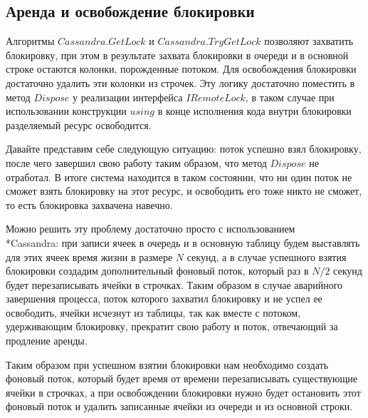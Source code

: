 \subsection{Аренда и освобождение блокировки}

Алгоритмы $Cassandra.GetLock$ и $Cassandra.TryGetLock$ позволяют захватить блокировку, при этом в результате захвата блокировки в очереди и в основной строке остаются колонки, порожденные потоком. Для освобождения блокировки достаточно удалить эти колонки из строчек. Эту логику достаточно поместить в метод $Dispose$ у реализации интерфейса $IRemoteLock$, в таком случае при использовании конструкции $using$ в конце исполнения кода внутри блокировки разделяемый ресурс освободится.

Давайте представим себе следующую ситуацию: поток успешно взял блокировку, после чего завершил свою работу таким образом, что метод $Dispose$ не отработал. В итоге система находится в таком состоянии, что ни один поток не сможет взять блокировку на этот ресурс, и освободить его тоже никто не сможет, то есть блокировка захвачена навечно.

Можно решить эту проблему достаточно просто с использованием \\*Cassandra: при записи ячеек в очередь и в основную таблицу будем выставлять для этих ячеек время жизни в размере $N$ секунд, а в случае успешного взятия блокировки создадим дополнительный фоновый поток, который раз в $N/2$ секунд будет перезаписывать ячейки в строчках. Таким образом в случае аварийного завершения процесса, поток которого захватил блокировку и не успел ее освободить, ячейки исчезнут из таблицы, так как вместе с потоком, удерживающим блокировку, прекратит свою работу и поток, отвечающий за продление аренды.

Таким образом при успешном взятии блокировки нам необходимо создать фоновый поток, который будет время от времени перезаписывать существующие ячейки в строчках, а при освобождении блокировки нужно будет остановить этот фоновый поток и удалить записанные ячейки из очереди и из основной строки.
